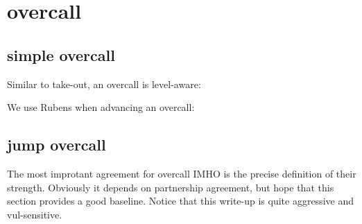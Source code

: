 \section{overcall}

\subsection{simple overcall}

Similar to take-out, an overcall is level-aware:


We use Rubens when advancing an overcall:


\subsection{jump overcall}

The most improtant agreement for overcall IMHO is the precise definition of their strength.
Obviously it depends on partnership agreement, but hope that this section provides a good baseline.
Notice that this write-up is quite aggressive and vul-sensitive.


